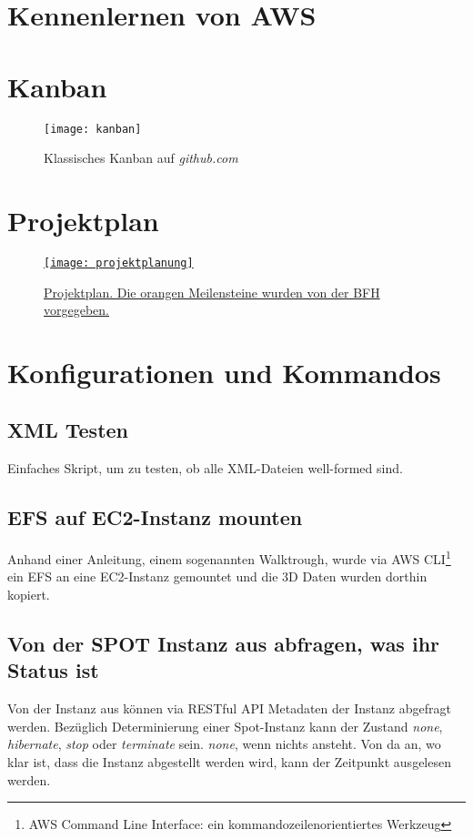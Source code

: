 \section{Kennenlernen von AWS}
\section{Kanban}\label{appendix:kanban}
\begin{figure}[H]
	\centering
	\texttt{[image: kanban]}
	\caption{Klassisches Kanban auf \emph{github.com}}
	\label{fig:Klassisches Kanban}
\end{figure}

\section{Projektplan}\label{appendix:projektplan}
\begin{figure}[H]
	\centering
	\href{https://docs.google.com/spreadsheets/d/1zKTZgt4BW736G0xRfU9o3vWYwAJj-8nzFvGsPR7yJ_0/edit?usp=sharing}{
	\texttt{[image: projektplanung]}}
	\caption{\href{https://docs.google.com/spreadsheets/d/1zKTZgt4BW736G0xRfU9o3vWYwAJj-8nzFvGsPR7yJ_0/edit?usp=sharing}{Projektplan. Die orangen Meilensteine wurden von der BFH vorgegeben.}}
	\label{fig:Projektplan}
\end{figure}

\section{Konfigurationen und Kommandos}
\subsection{XML Testen}
Einfaches Skript, um zu testen, ob alle XML-Dateien well-formed sind.

\subsection{EFS auf EC2-Instanz mounten}
Anhand einer Anleitung, einem sogenannten Walktrough, wurde via AWS CLI\footnote{AWS Command Line Interface: ein kommandozeilenorientiertes Werkzeug} ein
EFS an eine EC2-Instanz gemountet und die 3D Daten wurden dorthin kopiert.

\subsection{Von der SPOT Instanz aus abfragen, was ihr Status ist}\label{appendix:restful}
Von der Instanz aus können via RESTful API Metadaten der Instanz abgefragt werden. Bezüglich Determinierung einer Spot-Instanz kann der Zustand \emph{none}, \emph{hibernate}, \emph{stop} oder \emph{terminate} sein. \emph{none}, wenn nichts ansteht. Von da an, wo klar ist, dass die Instanz abgestellt werden wird, kann der Zeitpunkt ausgelesen werden.

